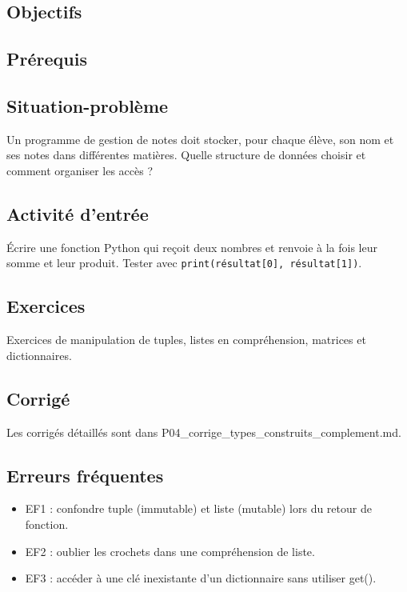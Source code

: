 \subsection{Objectifs}

\subsection{Prérequis}

\subsection{Situation-problème}

Un programme de gestion de notes doit stocker, pour chaque élève, son
nom et ses notes dans différentes matières. Quelle structure de données
choisir et comment organiser les accès ?

\subsection{Activité d’entrée}

Écrire une fonction Python qui reçoit deux nombres et renvoie à la fois
leur somme et leur produit. Tester avec \lstinline|print(résultat[0], résultat[1])|.

\subsection{Exercices}

Exercices de manipulation de tuples, listes en compréhension, matrices
et dictionnaires.

\subsection{Corrigé}

Les corrigés détaillés sont dans
P04\_corrige\_types\_construits\_complement.md.

\subsection{Erreurs fréquentes}

\begin{itemize}
\tightlist
\item
  EF1 : confondre tuple (immutable) et liste (mutable) lors du retour de
  fonction.
\item
  EF2 : oublier les crochets dans une compréhension de liste.
\item
  EF3 : accéder à une clé inexistante d'un dictionnaire sans utiliser
  get().
\end{itemize}

